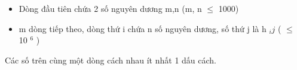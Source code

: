 \begin{itemize}
	\item Dòng đầu tiên chứa 2 số nguyên dương m,n (m, n  $\le$ 1000)
	\item m dòng tiếp theo, dòng thứ i chứa n số nguyên dương, số thứ j là h $_ ij $ ( $\le$ 10 $^ 6 $ )
\end{itemize}

Các số trên cùng một dòng cách nhau ít nhất 1 dấu cách.